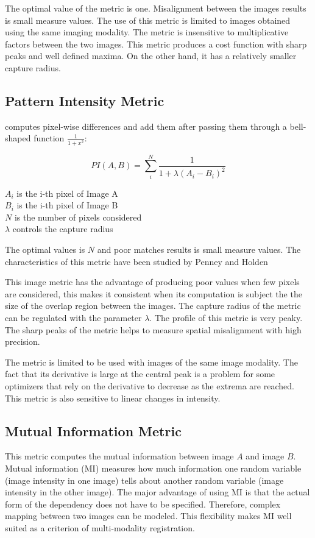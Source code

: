 The optimal value of the metric is one. Misalignment between the images results
is small measure values. The use of this metric is limited to images obtained
using the same imaging modality. The metric is insensitive to multiplicative
factors between the two images. This metric produces a cost function with sharp
peaks and well defined maxima. On the other hand, it has a relatively smaller
capture radius.

\subsection{Pattern Intensity Metric}
\label{sec:PatternIntensityMetric}
 computes pixel-wise differences and add them 
after passing them through a bell-shaped function $\frac{1}{1+x^2}$:

\begin{equation}
PI(A,B) =  \sum_i^N \frac{ 1 }{ 1 + \lambda \left( A_i - B_i \right) ^ 2 }
\end{equation}
\begin{center}
$A_i$ is the i-th pixel of Image A \\
$B_i$ is the i-th pixel of Image B \\
$N$ is the number of pixels considered \\
$\lambda$ controls the capture radius
\end{center}

The optimal values is $N$ and poor matches results is small measure values.
The characteristics of this metric have been studied by Penney and Holden
\cite{Holden1999}\cite{Penney1998}

This image metric has the advantage of producing poor values when few pixels
are considered, this makes it consistent when its computation is subject the
the size of the overlap region between the images. The capture radius of the
metric can be regulated with the parameter $\lambda$.  The profile of this
metric is very peaky. The sharp peaks of the metric helps
to measure spatial misalignment with high precision.

The metric is limited to be used with images of the same image modality.  The
fact that its derivative is large at the central peak is a problem for some
optimizers that rely on the derivative to decrease as the extrema are reached.
This metric is also sensitive to linear changes in intensity.


\subsection{Mutual Information Metric}
\label{sec:MutualInformationMetric}
This metric computes the mutual information between image $A$ and image $B$.
Mutual information (MI) measures how much information one random variable
(image intensity in one image) tells about another random variable 
(image intensity in the other image). The major advantage of using
MI is that the actual form of the dependency does not have to be specified. 
Therefore, complex mapping between two images can be modeled. 
This flexibility makes MI well suited as a criterion of multi-modality
registration.

